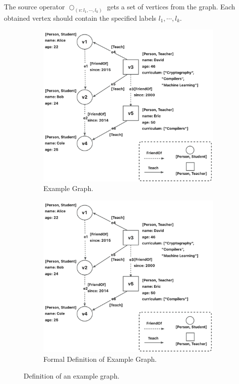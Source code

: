 \begin{definition}
    The source operator $\bigcirc_{(v:l_1, \cdots, l_k)}$ gets a set of vertices from the graph.
    Each obtained vertex should contain the specified labels $l_1, \cdots, l_k$.
\end{definition}

\begin{figure}
    \centering
    \begin{subfigure}[b]{0.4\linewidth}
        \centering
        \includegraphics[width=\linewidth]{./figures/example-graph.png}
        \caption{Example Graph.}
        \label{fig:example-graph}
    \end{subfigure}
    \begin{subfigure}[b]{0.4\linewidth}
        \centering
        \includegraphics[width=\linewidth]{./figures/example-graph.png}
        \caption{Formal Definition of Example Graph.}
        \label{fig:example-graph-def}
    \end{subfigure}
    \caption{Definition of an example graph.}
    \label{fig:example-graph-full}
\end{figure}

